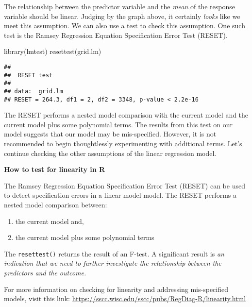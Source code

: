 \documentclass[
]{book}
\newenvironment{Shaded}{\begin{snugshade}}{\end{snugshade}}
\newcommand{\FunctionTok}[1]{\textcolor[rgb]{0.00,0.00,0.00}{#1}}
\newcommand{\NormalTok}[1]{#1}
\providecommand{\tightlist}{%
  \setlength{\itemsep}{0pt}\setlength{\parskip}{0pt}}
\begin{document}
The relationship between the predictor variable and the \emph{mean} of the response variable should be linear. Judging by the graph above, it certainly \emph{looks} like we meet this assumption. We can also use a test to check this assumption. One such test is the Ramsey Regression Equation Specification Error Test (RESET).

\begin{Shaded}
\begin{Highlighting}[]
\FunctionTok{library}\NormalTok{(lmtest)}
\FunctionTok{resettest}\NormalTok{(grid.lm)}
\end{Highlighting}
\end{Shaded}

\begin{verbatim}
## 
##  RESET test
## 
## data:  grid.lm
## RESET = 264.3, df1 = 2, df2 = 3348, p-value < 2.2e-16
\end{verbatim}

The RESET performs a nested model comparison with the current model and the current model plus some polynomial terms. The results from this test on our model suggests that our model may be mis-specified. However, it is not recommended to begin thoughtlessly experimenting with additional terms. Let's continue checking the other assumptions of the linear regression model.

\begin{blackbox}

\begin{center}
\textbf{How to test for linearity in R}

\end{center}

The Ramsey Regression Equation Specification Error Test (RESET) can be used to detect specification errors in a linear model model. The RESET performs a nested model comparison between:

\begin{enumerate}
\def\labelenumi{\arabic{enumi}.}
\tightlist
\item
  the current model and,
\item
  the current model plus some polynomial terms
\end{enumerate}

The \texttt{resettest()} returns the result of an F-test. A significant result is \emph{an indication that we need to further investigate the relationship between the predictors and the outcome.}

For more information on checking for linearity and addressing mis-specified models, visit this link: \url{https://sscc.wisc.edu/sscc/pubs/RegDiag-R/linearity.html}

\end{blackbox}
\end{document}
